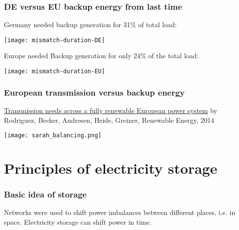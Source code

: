\documentclass[10pt,dvipsnames]{beamer}
\begin{document}
\begin{frame}
  \frametitle{DE versus EU backup energy from last time}

  Germany needed backup generation for 31\% of total load:

  \centering
  \texttt{[image: mismatch-duration-DE]}


  Europe needed Backup generation for only 24\% of the total load:

  \centering
  \texttt{[image: mismatch-duration-EU]}

\end{frame}


\begin{frame}
  \frametitle{European transmission versus backup energy}

  \href{http://www.sciencedirect.com/science/article/pii/S0960148113005351}{Transmission needs across a fully renewable European power system} by Rodriguez, Becker, Andresen, Heide, Greiner, Renewable Energy, 2014

  \centering
  \texttt{[image: sarah\_balancing.png]}


\end{frame}

\section{Principles of electricity storage}


\begin{frame}
  \frametitle{Basic idea of storage}

  Networks were used to shift power imbalances between different
  places, i.e. in \alert{space}. Electricity storage can shift power in \alert{time}.

  \vspace{0.5cm}


\end{frame}
\end{document}
